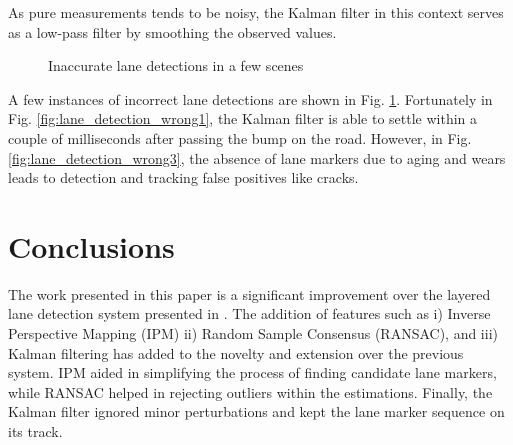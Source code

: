 \documentclass{article}
\begin{document}
As pure measurements tends to be noisy, the Kalman filter in this context serves as a low-pass filter by smoothing the observed values.
\begin{figure}[htb!]
  \centering
  \hspace{0.00001in}
  \caption{Inaccurate lane detections in a few scenes}
  \label{fig:lane_detection_wrong}
\end{figure}

A few instances of incorrect lane detections are shown in Fig. \ref{fig:lane_detection_wrong}. Fortunately in Fig. \ref{fig:lane_detection_wrong1}, the Kalman filter is able to settle within a couple of milliseconds after passing the bump on the road. However, in Fig. \ref{fig:lane_detection_wrong3}, the absence of lane markers due to aging and wears leads to detection and tracking false positives like cracks.

\section{Conclusions}
\label{sec:concl}
The work presented in this paper is a significant improvement over the layered lane detection system presented in \cite{borkar_layered_2009}. The addition of features such as i) Inverse Perspective Mapping (IPM) ii) Random Sample Consensus (RANSAC), and iii) Kalman filtering has added to the novelty and extension over the previous system. IPM aided in simplifying the process of finding candidate lane markers, while RANSAC helped in rejecting outliers within the estimations. Finally, the Kalman filter ignored minor perturbations and kept the lane marker sequence on its track.
\end{document}
